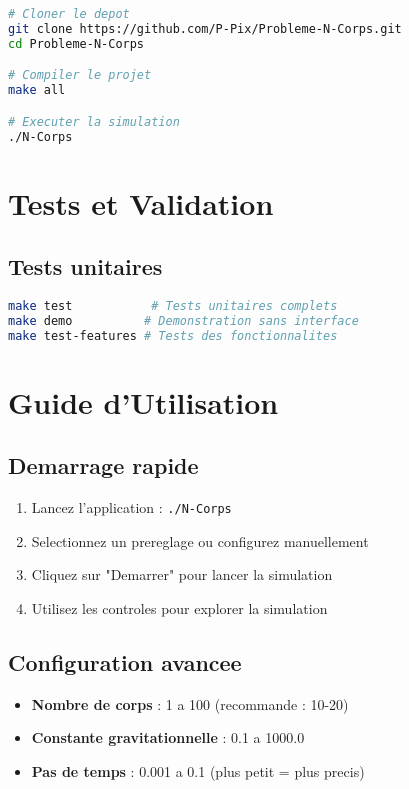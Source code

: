 \documentclass[12pt,a4paper]{article}
\begin{document}
\begin{lstlisting}[language=bash, caption=Processus de compilation]
# Cloner le depot
git clone https://github.com/P-Pix/Probleme-N-Corps.git
cd Probleme-N-Corps

# Compiler le projet
make all

# Executer la simulation
./N-Corps
\end{lstlisting}

\section{Tests et Validation}

\subsection{Tests unitaires}

\begin{lstlisting}[language=bash, caption=Execution des tests]
make test           # Tests unitaires complets
make demo          # Demonstration sans interface
make test-features # Tests des fonctionnalites
\end{lstlisting}

\section{Guide d'Utilisation}

\subsection{Demarrage rapide}

\begin{enumerate}
    \item Lancez l'application : \texttt{./N-Corps}
    \item Selectionnez un prereglage ou configurez manuellement
    \item Cliquez sur "Demarrer" pour lancer la simulation
    \item Utilisez les controles pour explorer la simulation
\end{enumerate}

\subsection{Configuration avancee}

\begin{itemize}
    \item \textbf{Nombre de corps} : 1 a 100 (recommande : 10-20)
    \item \textbf{Constante gravitationnelle} : 0.1 a 1000.0
    \item \textbf{Pas de temps} : 0.001 a 0.1 (plus petit = plus precis)
\end{itemize}
\end{document}
